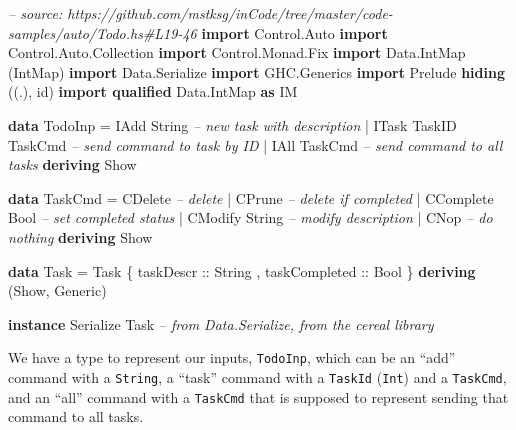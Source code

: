 \documentclass[]{article}
\newenvironment{Shaded}{}{}
\newcommand{\KeywordTok}[1]{\textcolor[rgb]{0.00,0.44,0.13}{\textbf{{#1}}}}
\newcommand{\DataTypeTok}[1]{\textcolor[rgb]{0.56,0.13,0.00}{{#1}}}
\newcommand{\CommentTok}[1]{\textcolor[rgb]{0.38,0.63,0.69}{\textit{{#1}}}}
\newcommand{\OtherTok}[1]{\textcolor[rgb]{0.00,0.44,0.13}{{#1}}}
\newcommand{\FunctionTok}[1]{\textcolor[rgb]{0.02,0.16,0.49}{{#1}}}
\newcommand{\NormalTok}[1]{{#1}}
\begin{document}
\begin{Shaded}
\begin{Highlighting}[]
\CommentTok{-- source: https://github.com/mstksg/inCode/tree/master/code-samples/auto/Todo.hs#L19-46}
\KeywordTok{import }\DataTypeTok{Control.Auto}
\KeywordTok{import }\DataTypeTok{Control.Auto.Collection}
\KeywordTok{import }\DataTypeTok{Control.Monad.Fix}
\KeywordTok{import }\DataTypeTok{Data.IntMap}             \NormalTok{(}\DataTypeTok{IntMap}\NormalTok{)}
\KeywordTok{import }\DataTypeTok{Data.Serialize}
\KeywordTok{import }\DataTypeTok{GHC.Generics}
\KeywordTok{import }\DataTypeTok{Prelude} \KeywordTok{hiding}          \NormalTok{((.), id)}
\KeywordTok{import qualified} \DataTypeTok{Data.IntMap}   \KeywordTok{as} \DataTypeTok{IM}

\KeywordTok{data} \DataTypeTok{TodoInp} \FunctionTok{=} \DataTypeTok{IAdd}  \DataTypeTok{String}           \CommentTok{-- new task with description}
             \FunctionTok{|} \DataTypeTok{ITask} \DataTypeTok{TaskID} \DataTypeTok{TaskCmd}   \CommentTok{-- send command to task by ID}
             \FunctionTok{|} \DataTypeTok{IAll} \DataTypeTok{TaskCmd}           \CommentTok{-- send command to all tasks}
             \KeywordTok{deriving} \DataTypeTok{Show}

\KeywordTok{data} \DataTypeTok{TaskCmd} \FunctionTok{=} \DataTypeTok{CDelete}          \CommentTok{-- delete}
             \FunctionTok{|} \DataTypeTok{CPrune}           \CommentTok{-- delete if completed}
             \FunctionTok{|} \DataTypeTok{CComplete} \DataTypeTok{Bool}   \CommentTok{-- set completed status}
             \FunctionTok{|} \DataTypeTok{CModify} \DataTypeTok{String}   \CommentTok{-- modify description}
             \FunctionTok{|} \DataTypeTok{CNop}             \CommentTok{-- do nothing}
             \KeywordTok{deriving} \DataTypeTok{Show}

\KeywordTok{data} \DataTypeTok{Task} \FunctionTok{=} \DataTypeTok{Task} \NormalTok{\{}\OtherTok{ taskDescr     ::} \DataTypeTok{String}
                 \NormalTok{,}\OtherTok{ taskCompleted ::} \DataTypeTok{Bool}
                 \NormalTok{\} }\KeywordTok{deriving} \NormalTok{(}\DataTypeTok{Show}\NormalTok{, }\DataTypeTok{Generic}\NormalTok{)}

\KeywordTok{instance} \DataTypeTok{Serialize} \DataTypeTok{Task} \CommentTok{-- from Data.Serialize, from the cereal library}
\end{Highlighting}
\end{Shaded}

We have a type to represent our inputs, \texttt{TodoInp}, which can be an
``add'' command with a \texttt{String}, a ``task'' command with a
\texttt{TaskId} (\texttt{Int}) and a \texttt{TaskCmd}, and an ``all'' command
with a \texttt{TaskCmd} that is supposed to represent sending that command to
all tasks.
\end{document}
